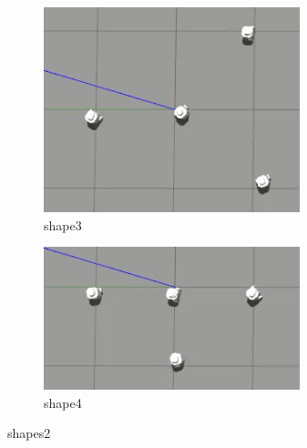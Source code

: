 \documentclass[12pt]{extarticle}
\begin{document}
\begin{figure}[H]
\centering
\begin{subfigure}{.5\textwidth}
  \centering
  \includegraphics[width=.7\linewidth]{shape3}
  \caption{shape3}
  \label{fig:sub1}
\end{subfigure}%
\begin{subfigure}{.5\textwidth}
  \centering
  \includegraphics[width=.7\linewidth]{shape4}
  \caption{shape4}
  \label{fig:sub2}
\end{subfigure}
\caption{shapes2}
\label{fig:test}



\end{figure}
\end{document}
